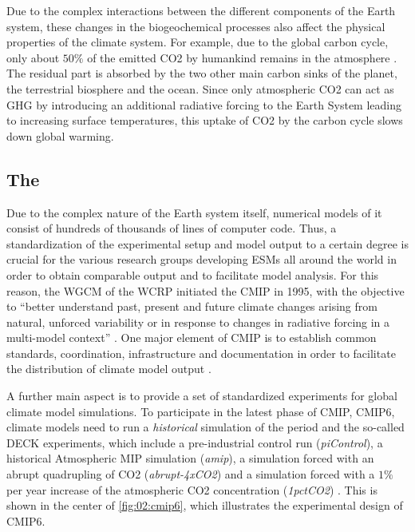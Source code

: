 Due to the complex interactions between the different components of the Earth
system, these changes in the biogeochemical processes also affect the physical
properties of the climate system. For example, due to the global carbon cycle,
only about $50 \unit{\%}$ of the emitted \ac{CO2} by humankind remains in the
atmosphere \autocite{Friedlingstein2020}. The residual part is absorbed by the
two other main carbon sinks of the planet, the terrestrial biosphere and the
ocean. Since only atmospheric \ac{CO2} can act as \ac{GHG} by introducing an
additional radiative forcing to the Earth System leading to increasing surface
temperatures, this uptake of \ac{CO2} by the carbon cycle slows down global
warming.


\subsection{The }
\label{subsec:02:cmip}

Due to the complex nature of the Earth system itself, numerical models of it
consist of hundreds of thousands of lines of computer code. Thus, a
standardization of the experimental setup and model output to a certain degree
is crucial for the various research groups developing \acp{ESM} all around the
world in order to obtain comparable output and to facilitate model analysis.
For this reason, the \ac{WGCM} of the \ac{WCRP} initiated the \acf{CMIP} in
1995, with the objective to \enquote{better understand past, present and future
  climate changes arising from natural, unforced variability or in response to
  changes in radiative forcing in a multi-model context} \autocite{WCRP2020}.
One major element of \ac{CMIP} is to establish common standards, coordination,
infrastructure and documentation in order to facilitate the distribution of
climate model output \autocite{Eyring2016, Juckes2020}.

A further main aspect is to provide a set of standardized experiments for
global climate model simulations. To participate in the latest phase of
\ac{CMIP}, \acs{CMIP}6, climate models need to run a \emph{historical}
simulation of the period  and the so-called \ac{DECK}
experiments, which include a pre-industrial control run (\emph{piControl}), a
historical Atmospheric \ac{MIP} simulation (\emph{amip}), a simulation forced
with an abrupt quadrupling of \ac{CO2} (\emph{abrupt-4xCO2}) and a simulation
forced with a $1 \unit{\%}$ per year increase of the atmospheric \ac{CO2}
concentration (\emph{1pctCO2}) \autocite{Eyring2016}. This is shown in the
center of \cref{fig:02:cmip6}, which illustrates the experimental design of
\acs{CMIP}6.

